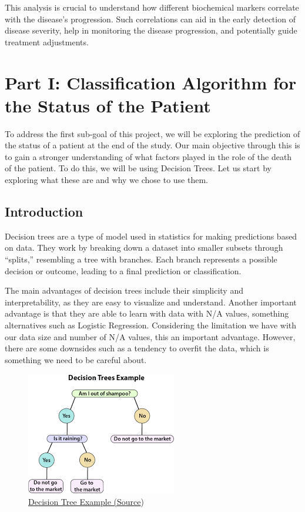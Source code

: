 \documentclass[
]{article}
\begin{document}
This analysis is crucial to understand how different biochemical markers
correlate with the disease's progression. Such correlations can aid in
the early detection of disease severity, help in monitoring the disease
progression, and potentially guide treatment adjustments.

\hypertarget{part-i-classification-algorithm-for-the-status-of-the-patient}{%
\section{Part I: Classification Algorithm for the Status of the
Patient}\label{part-i-classification-algorithm-for-the-status-of-the-patient}}

To address the first sub-goal of this project, we will be exploring the
prediction of the status of a patient at the end of the study. Our main
objective through this is to gain a stronger understanding of what
factors played in the role of the death of the patient. To do this, we
will be using Decision Trees. Let us start by exploring what these are
and why we chose to use them.

\hypertarget{introduction}{%
\subsection{Introduction}\label{introduction}}

Decision trees are a type of model used in statistics for making
predictions based on data. They work by breaking down a dataset into
smaller subsets through ``splits,'' resembling a tree with branches.
Each branch represents a possible decision or outcome, leading to a
final prediction or classification.

The main advantages of decision trees include their simplicity and
interpretability, as they are easy to visualize and understand. Another
important advantage is that they are able to learn with data with N/A
values, something alternatives such as Logistic Regression. Considering
the limitation we have with our data size and number of N/A values, this
an important advantage. However, there are some downsides such as a
tendency to overfit the data, which is something we need to be careful
about.

\begin{figure}
\centering
\includegraphics{DecTreeEg.png}
\caption{\ul{Decision Tree Example
(}\href{https://data-flair.training/blogs/r-decision-trees/}{Source})}
\end{figure}
\end{document}
